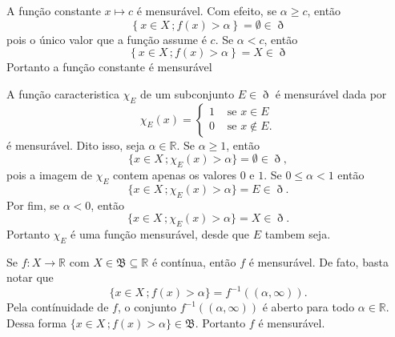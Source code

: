 \documentclass[a4paper, 11pt]{book}
\theoremstyle{definition}
\newcommand{\bR}{\mathbb{R}}
\newcommand{\cB}{\mathfrak{B}}
\begin{document}
\begin{ex}
    A função constante $x \mapsto c$ é mensurável.
    Com efeito, se $\alpha \geqslant c$, então
    \[
        \left\{ x \in X \,; f(x) > \alpha \right\} = \emptyset \in \eth
    \]
    pois o único valor que a função assume é $c$.
    Se $\alpha < c$, então
    \[
        \left\{ x \in X \,; f(x) > \alpha \right\} = X \in \eth
    \]
    Portanto a função constante é mensurável
\end{ex}

\begin{ex}
    A função caracteristica $\chi_E$ de um subconjunto $E \in \eth$ é mensurável dada por
    \[
        \chi_E(x) = \left\{ 
            \begin{aligned}
                1 & \text{ se } x \in E\\
                0 & \text{ se } x \not\in E.
            \end{aligned}
        \right.
    \]
    é mensurável.
    Dito isso, seja $\alpha \in \bR$.
    Se $\alpha \geqslant 1$, então
    \[
        \{x \in X \,; \chi_E(x) > \alpha\} = \emptyset \in \eth,
    \]
    pois a imagem de $\chi_E$ contem apenas os valores $0$ e $1$.
    Se $0 \leqslant \alpha < 1$ então
    \[
        \{x \in X \,; \chi_E(x) > \alpha\} = E \in \eth.
    \]
    Por fim, se $\alpha < 0$, então
    \[
        \{x \in X \,; \chi_E(x) > \alpha\} = X \in \eth.
    \]
    Portanto $\chi_E$ é uma função mensurável, desde que $E$ tambem seja.
\end{ex}

\begin{ex}
    Se $f : X \to \bR$ com $X \in \cB \subseteq \bR$ é contínua, então $f$ é mensurável. De fato, basta notar que
    \[
        \{ x \in X \,; f(x) > \alpha\} = f^{-1}((\alpha,\infty)).
    \]
    Pela contínuidade de $f$, o conjunto $f^{-1}((\alpha,\infty))$ é aberto para todo $\alpha \in \bR$.
    Dessa forma $\{x \in X \,; f(x) > \alpha\} \in \cB$.
    Portanto $f$ é mensurável.
\end{ex}
\end{document}
